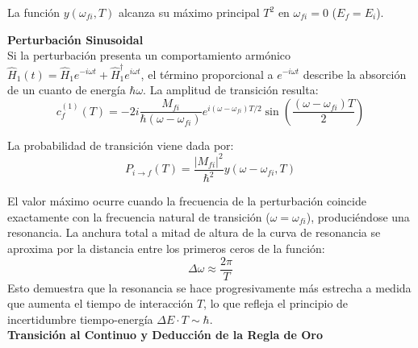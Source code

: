 La función $y(\omega_{fi}, T)$ alcanza su máximo principal $T^2$ en $\omega_{fi} = 0$ ($E_f = E_i$).

\begin{center}
\end{center}

\textbf{Perturbación Sinusoidal}\\
Si la perturbación presenta un comportamiento armónico $\hat{H}_1(t) = \hat{H}_1 e^{-i\omega t} + \hat{H}_1^\dagger e^{i\omega t}$, el término proporcional a $e^{-i\omega t}$ describe la absorción de un cuanto de energía $\hbar\omega$. La amplitud de transición resulta:
\begin{equation}
c_f^{(1)}(T) = -2i \frac{M_{fi}}{\hbar (\omega - \omega_{fi})} e^{i (\omega - \omega_{fi}) T / 2} \sin\left( \frac{(\omega - \omega_{fi}) T}{2} \right)
\end{equation}

La probabilidad de transición viene dada por:
\begin{equation}
P_{i \to f}(T) = \frac{|M_{fi}|^2}{\hbar^2} y(\omega - \omega_{fi}, T)
\end{equation}

El valor máximo ocurre cuando la frecuencia de la perturbación coincide exactamente con la frecuencia natural de transición ($\omega = \omega_{fi}$), produciéndose una resonancia. La anchura total a mitad de altura de la curva de resonancia se aproxima por la distancia entre los primeros ceros de la función:
\begin{equation}
\Delta\omega \approx \frac{2\pi}{T}
\end{equation}
Esto demuestra que la resonancia se hace progresivamente más estrecha a medida que aumenta el tiempo de interacción $T$, lo que refleja el principio de incertidumbre tiempo-energía $\Delta E \cdot T \sim \hbar$.\\[4pt]
\textbf{Transición al Continuo y Deducción de la Regla de Oro}

